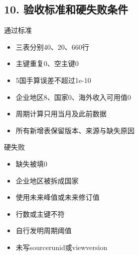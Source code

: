 \documentclass[UTF8,openany,zihao=-4]{ctexbook}
\renewcommand{\_}{\textunderscore\allowbreak}
\begin{document}
\subsection*{10. 验收标准和硬失败条件}
\begin{statusbox}{通过标准}
\begin{itemize}[label=$\square$]
\item 三表分别40、20、660行
\item 主键重复0、空主键0
\item 5国手算误差不超过1e-10
\item 企业地区8、国家0、海外收入可用值0
\item 周期计算只用当月及此前数据
\item 所有新增表保留版本、来源与缺失原因
\end{itemize}
\end{statusbox}
\begin{dangerbox}{硬失败}
\begin{itemize}
\item 缺失被填0
\item 企业地区被拆成国家
\item 使用未来峰值或未来修订值
\item 行数或主键不符
\item 自行发明周期阈值
\item 未写source\_run\_id或view\_version
\end{itemize}
\end{dangerbox}
\end{document}
